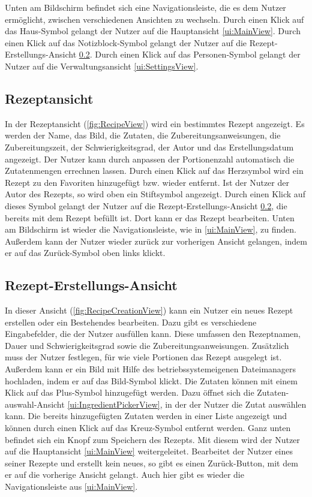 \documentclass[parskip=full]{scrartcl}
\begin{document}
Unten am Bildschirm befindet sich eine Navigationsleiste, die es dem Nutzer ermöglicht, zwischen verschiedenen Ansichten zu wechseln. Durch einen Klick auf das Haus-Symbol gelangt der Nutzer auf die Hauptansicht \ref{ui:MainView}. Durch einen Klick auf das Notizblock-Symbol gelangt der Nutzer auf die Rezept-Erstellungs-Ansicht \ref{ui:RecipeCreationView}. Durch einen Klick auf das Personen-Symbol gelangt der Nutzer auf die Verwaltungsansicht \ref{ui:SettingsView}.

\subsection{Rezeptansicht}
\label{ui:RecipeView}

In der Rezeptansicht (\autoref{fig:RecipeView}) wird ein bestimmtes Rezept angezeigt. Es werden der Name, das Bild, die Zutaten, die Zubereitungsanweisungen, die Zubereitungszeit, der Schwierigkeitsgrad, der Autor und das Erstellungsdatum angezeigt. Der Nutzer kann durch anpassen der Portionenzahl automatisch die Zutatenmengen errechnen lassen. Durch einen Klick auf das Herzsymbol wird ein Rezept zu den Favoriten hinzugefügt bzw. wieder entfernt. Ist der Nutzer der Autor des Rezepts, so wird oben ein Stiftsymbol angezeigt. Durch einen Klick auf dieses Symbol gelangt der Nutzer auf die Rezept-Erstellungs-Ansicht \ref{ui:RecipeCreationView}, die bereits mit dem Rezept befüllt ist. Dort kann er das Rezept bearbeiten. Unten am Bildschirm ist wieder die Navigationsleiste, wie in \ref{ui:MainView}, zu finden. Außerdem kann der Nutzer wieder zurück zur vorherigen Ansicht gelangen, indem er auf das Zurück-Symbol oben links klickt.


\subsection{Rezept-Erstellungs-Ansicht}
\label{ui:RecipeCreationView}
In dieser Ansicht (\autoref{fig:RecipeCreationView}) kann ein Nutzer ein neues Rezept erstellen oder ein Bestehendes bearbeiten. Dazu gibt es verschiedene Eingabefelder, die der Nutzer ausfüllen kann. Diese umfassen den Rezeptnamen, Dauer und Schwierigkeitsgrad sowie die Zubereitungsanweisungen. Zusätzlich muss der Nutzer festlegen, für wie viele Portionen das Rezept ausgelegt ist. Außerdem kann er ein Bild mit Hilfe des betriebssystemeigenen Dateimanagers hochladen, indem er auf das Bild-Symbol klickt.
Die Zutaten können mit einem Klick auf das Plus-Symbol hinzugefügt werden. Dazu öffnet sich die Zutaten-auswahl-Ansicht \ref{ui:IngredientPickerView}, in der der Nutzer die Zutat auswählen kann. Die bereits hinzugefügten Zutaten werden in einer Liste angezeigt und können durch einen Klick auf das Kreuz-Symbol entfernt werden. Ganz unten befindet sich ein Knopf zum Speichern des Rezepts. Mit diesem wird der Nutzer auf die Hauptansicht \ref{ui:MainView} weitergeleitet. Bearbeitet der Nutzer eines seiner Rezepte und erstellt kein neues, so gibt es einen Zurück-Button, mit dem er auf die vorherige Ansicht gelangt. Auch hier gibt es wieder die Navigationsleiste aus \ref{ui:MainView}.
\end{document}
